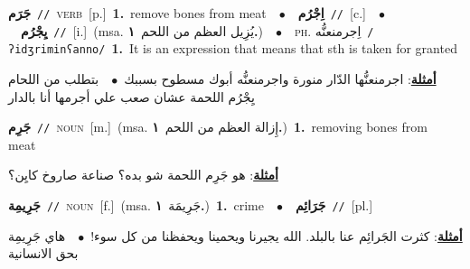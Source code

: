 \documentclass[10pt,a4paper,twoside]{article} %
\begin{document}
\begin{multicols}{2}
{\setlength\topsep{0pt}\textbf{\foreignlanguage{arabic}{جَرَم}}\ {\color{gray}\texttt{//}\color{black}}\ \textsc{verb}\ [p.]\ \textbf{1.}~remove bones from meat\ \ $\bullet$\ \ \setlength\topsep{0pt}\textbf{\foreignlanguage{arabic}{اِجْرُم}}\ {\color{gray}\texttt{//}\color{black}}\ [c.]\ \ $\bullet$\ \ \setlength\topsep{0pt}\textbf{\foreignlanguage{arabic}{يِجْرُم}}\ {\color{gray}\texttt{//}\color{black}}\ [i.]\ \color{gray}(msa. \foreignlanguage{arabic}{يُزِيل العظم من اللحم}~\foreignlanguage{arabic}{\textbf{١.}})\color{black}\ \ $\bullet$\ \ \textsc{ph.} \color{gray} \foreignlanguage{arabic}{اِجرمنعنُّه}\color{black}\ {\color{gray}\texttt{/{\sffamily ʔidʒriminʕanno}/}\color{black}}\ \textbf{1.}~It is an expression that means that sth is taken for granted\  \begin{flushright}\color{gray}\foreignlanguage{arabic}{\textbf{\underline{\foreignlanguage{arabic}{أمثلة}}}: اجرمنعنُّها الدّار منورة واجرمنعنُّه  أبوك مسطوح بسببك\ $\bullet$\ \  بتطلب من اللحام يِجْرُم اللحمة عشان صعب علي أجرمها أنا بالدار}\end{flushright}\color{black}} \vspace{2mm}

{\setlength\topsep{0pt}\textbf{\foreignlanguage{arabic}{جَرِم}}\ {\color{gray}\texttt{//}\color{black}}\ \textsc{noun}\ [m.]\ \color{gray}(msa. \foreignlanguage{arabic}{إِزالة العظم من اللحم}~\foreignlanguage{arabic}{\textbf{١.}})\color{black}\ \textbf{1.}~removing bones from meat\  \begin{flushright}\color{gray}\foreignlanguage{arabic}{\textbf{\underline{\foreignlanguage{arabic}{أمثلة}}}: هو جَرِم اللحمة شو بده؟ صناعة صاروخ كايِن؟}\end{flushright}\color{black}} \vspace{2mm}

{\setlength\topsep{0pt}\textbf{\foreignlanguage{arabic}{جَرِيمِة}}\ {\color{gray}\texttt{//}\color{black}}\ \textsc{noun}\ [f.]\ \color{gray}(msa. \foreignlanguage{arabic}{جَرِيمَة}~\foreignlanguage{arabic}{\textbf{١.}})\color{black}\ \textbf{1.}~crime\ \ $\bullet$\ \ \setlength\topsep{0pt}\textbf{\foreignlanguage{arabic}{جَرَائِم}}\ {\color{gray}\texttt{//}\color{black}}\ [pl.]\  \begin{flushright}\color{gray}\foreignlanguage{arabic}{\textbf{\underline{\foreignlanguage{arabic}{أمثلة}}}: كثرت الجَرائِم عنا بالبلد. الله يجيرنا ويحمينا ويحفظنا من كل سوء!\ $\bullet$\ \  هاي جَرِيمِة بحق الانسانية}\end{flushright}\color{black}} \vspace{2mm}


\end{multicols}
\end{document}
